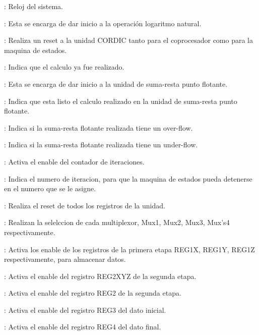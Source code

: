 \begin{compactitem}
\item {}: Reloj del sistema. 

\item {}: Esta se encarga de dar inicio a la operación logaritmo natural. 

\item {}: Realiza un reset a la unidad CORDIC tanto para el coprocesador como para la maquina de estados.
 

\item {}: Indica que el calculo ya fue realizado.

\item {}: Esta se encarga de dar inicio a la unidad de suma-resta punto flotante.

\item {}: Indica que esta listo el calculo realizado en la unidad de suma-resta punto flotante.

\item {}: Indica si la suma-resta flotante realizada tiene un over-flow.

\item {}: Indica si la suma-resta flotante realizada tiene un under-flow.

\item {}: Activa el enable del contador de iteraciones. 

\item {}: Indica el numero de iteracion, para que la maquina de estados pueda detenerse en el numero que se le asigne.
 
\item {}: Realiza el reset de todos los registros de la unidad.

\item {}: Realizan la selelccion de cada multiplexor, Mux1, Mux2, Mux3, Mux's4 respectivamente.

\item {}: Activa los enable de los registros de la primera etapa REG1X, REG1Y, REG1Z respectivamente, para almacenar datos. 

\item {}: Activa el enable del registro REG2XYZ de la segunda etapa. 

\item {}: Activa el enable del registro REG2 de la segunda etapa.

\item {}: Activa el enable del registro REG3 del dato inicial.

\item {}: Activa el enable del registro REG4 del dato final. 

\end{compactitem}

